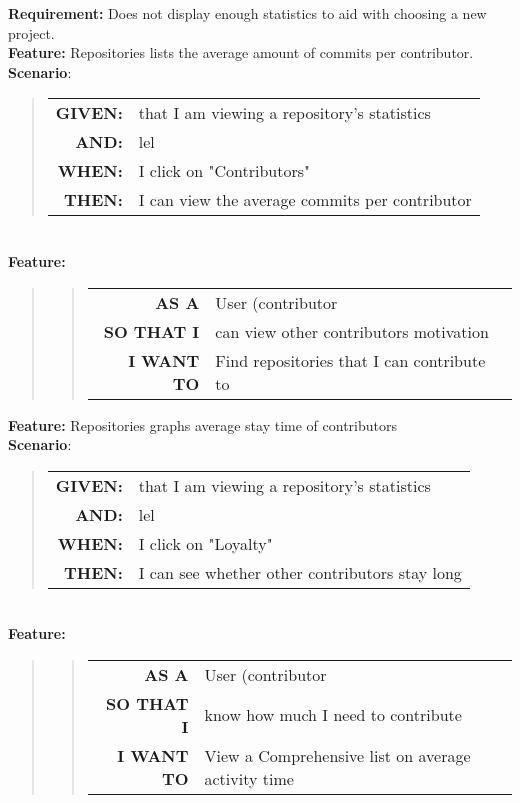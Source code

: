 \documentclass[12pt]{article}
\newcommand{\Requirement}[1] {
   \noindent \textbf{Requirement:} #1
}
\newcommand{\Feature}[1]{ 
   \noindent \textbf{Feature:} #1
}
\newcommand{\FeatureC}[4]{ 
	\begin{quote}
	\begin{tabular}{rl}
	\textbf{AS A} & #1\\
	\textbf{SO THAT \uppercase{#2}} & #3\\
	\textbf{\uppercase{#2} WANT TO} & #4  
	\end{tabular}
	\end{quote}
}
\newcommand{\GivenSc} {
	\noindent \textbf{GIVEN:}
	}
\newcommand{\WhenSc} {
	\noindent \textbf{WHEN:}
	}
\newcommand{\AndSc} {
	\noindent \textbf{AND:}
	}
\newcommand{\ThenSc} {
	\noindent \textbf{THEN:}
	}
\begin{document}
\begin{framed}
\Requirement{Does not display enough statistics to aid with choosing a new project.}\\[0.2cm]
\Feature{Repositories lists the average amount of commits per contributor.}\\[0.4cm]
\noindent \textbf{Scenario}:
\begin{quote}
\begin{tabular}{rl}
\GivenSc & that I am viewing a repository's statistics\\
\AndSc & lel\\
\WhenSc & I click on "Contributors"\\
\ThenSc & I can view the average commits per contributor
\end{tabular}
\end{quote}
~\\
\Feature{}
\begin{quote}
\FeatureC{User (contributor}{I}{can view other contributors motivation}{Find repositories that I can contribute to}
\end{quote}

\Feature{Repositories graphs average stay time of contributors}\\[0.4cm]
\noindent \textbf{Scenario}:
\begin{quote}
\begin{tabular}{rl}
\GivenSc & that I am viewing a repository's statistics\\
\AndSc & lel\\
\WhenSc & I click on "Loyalty"\\
\ThenSc & I can see whether other contributors stay long
\end{tabular}
\end{quote}
~\\
\Feature{}
\begin{quote}
\FeatureC{User (contributor}{I}{know how much I need to contribute}{View a Comprehensive list on average activity time}
\end{quote}
\
\end{framed}
\end{document}
